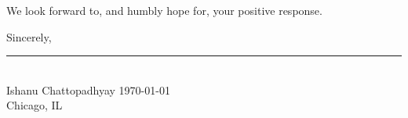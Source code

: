 \documentclass[9pt,onecolumn,compsoc]{IEEEtran}
\newcommand{\Space}{\vspace{10pt}}
\begin{document}
 We look forward to, and humbly hope for, your positive  response.
\Space

Sincerely,
\vspace{-30pt}

% 
\begin{flushleft}
\vspace{-30pt}

\rule{2.5in}{1pt}\\
{\fontsize{10}{10}\selectfont Ishanu Chattopadhyay}
\hfill \today\\
Chicago, IL
\end{flushleft}

\end{document}
